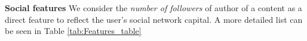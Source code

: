 	\noindent\textbf{Social  features} We consider the \emph{number of followers} of  author of a content as a direct feature to reflect the user's social network capital. 
	A more detailed list can be seen in  Table \ref{tab:Features_table}

%
%
